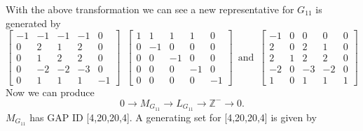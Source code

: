 \documentclass{article}
\theoremstyle{plain}
\theoremstyle{definition}
\newcommand{\Z}{\ensuremath{\mathbb{Z}}}
\newcommand{\tand}{\ensuremath{\,\,\, \text{and} \,\,\,}}
\newcommand{\exactseqs}[1]{\ensuremath{0 \longrightarrow M_{#1} \longrightarrow L_{#1} \longrightarrow \Z^{-} \longrightarrow 0}}
\begin{document}
With the above transformation we can see a new representative for $G_{11}$ is generated by 
$$
\left[ \begin {array}{cccc|c} -1&-1&-1&-1&0\\ 0&2&1&
2&0\\ 0&1&2&2&0\\ 0&-2&-2&-3&0
\\ \hline 0&1&1&1&-1\end {array} \right] 
\,\,\,
 \left[ \begin {array}{cccc|c} 1&1&1&1&0\\ 0&-1&0&0&0
\\ 0&0&-1&0&0\\ 0&0&0&-1&0
\\ \hline 0&0&0&0&-1\end {array} \right] 
\tand
 \left[ \begin {array}{cccc|c} -1&0&0&0&0\\ 2&0&2&1&0
\\ 2&1&2&2&0\\ -2&0&-3&-2&0
\\ \hline 1&0&1&1&1\end {array} \right] 
$$
 Now we can produce
$$
\exactseqs{G_{11}}
.$$
$M_{G_{11}}$ has GAP ID [4,20,20,4]. A generating set for [4,20,20,4] is given by 
\end{document}
